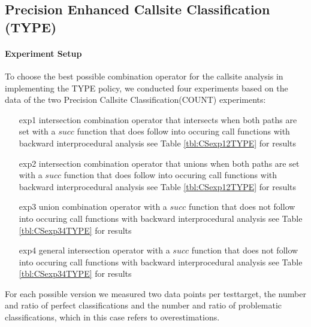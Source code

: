 %	
%
%
%

\subsection{Precision Enhanced Callsite Classification (TYPE)}
\label{subsection:typeshieldprecision}

\paragraph{Experiment Setup}
To choose the best possible combination operator for the callsite analysis in implementing the TYPE policy, we conducted four experiments based on the data of the two Precision Callsite Classification(COUNT) experiments:
\begin{enumerate}
\item[exp1] intersection combination operator that intersects when both paths are set with a $succ$ function that does follow into occuring call functions with backward interprocedural analysis see Table \ref{tbl:CSexp12TYPE} for results

\item[exp2] intersection combination operator that unions when both paths are set with a $succ$ function that does follow into occuring call functions  with backward interprocedural analysis  see Table \ref{tbl:CSexp12TYPE} for results

\item[exp3] union combination operator with a $succ$ function that does not follow into occuring call functions  with backward interprocedural analysis  see Table \ref{tbl:CSexp34TYPE} for results

\item[exp4] general intersection operator with a $succ$ function that does not follow into occuring call functions  with backward interprocedural analysis  see Table \ref{tbl:CSexp34TYPE} for results
\end{enumerate}
For each possible version we measured two data points per testtarget, the number and ratio of perfect classifications and the number and ratio of problematic classifications, which in this case refers to overestimations.

